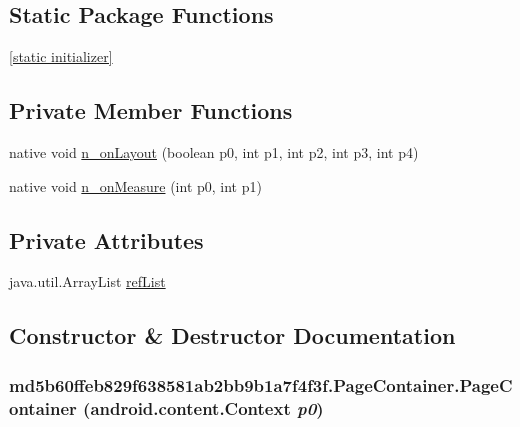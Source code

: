 \subsection*{Static Package Functions}
\begin{CompactItemize}
\item 
\hyperlink{classmd5b60ffeb829f638581ab2bb9b1a7f4f3f_1_1_page_container_d1b495b4e40fe9a2d5927fd583b424d3}{\mbox{[}static initializer\mbox{]}}
\end{CompactItemize}
\subsection*{Private Member Functions}
\begin{CompactItemize}
\item 
native void \hyperlink{classmd5b60ffeb829f638581ab2bb9b1a7f4f3f_1_1_page_container_4fc5addfec5aa835740568136e2490b3}{n\_\-onLayout} (boolean p0, int p1, int p2, int p3, int p4)
\item 
native void \hyperlink{classmd5b60ffeb829f638581ab2bb9b1a7f4f3f_1_1_page_container_0ab7d3b01cff4ea7d12a0e0f0ffe7968}{n\_\-onMeasure} (int p0, int p1)
\end{CompactItemize}
\subsection*{Private Attributes}
\begin{CompactItemize}
\item 
java.util.ArrayList \hyperlink{classmd5b60ffeb829f638581ab2bb9b1a7f4f3f_1_1_page_container_140eed57f6a804023f57102ca6978d13}{refList}
\end{CompactItemize}


\subsection{Constructor \& Destructor Documentation}
\hypertarget{classmd5b60ffeb829f638581ab2bb9b1a7f4f3f_1_1_page_container_09eff7efc044cb7fe8bad3d17dcef2bf}{
\subsubsection[{PageContainer}]{\setlength{\rightskip}{0pt plus 5cm}md5b60ffeb829f638581ab2bb9b1a7f4f3f.PageContainer.PageContainer (android.content.Context {\em p0})}}
\label{classmd5b60ffeb829f638581ab2bb9b1a7f4f3f_1_1_page_container_09eff7efc044cb7fe8bad3d17dcef2bf}


